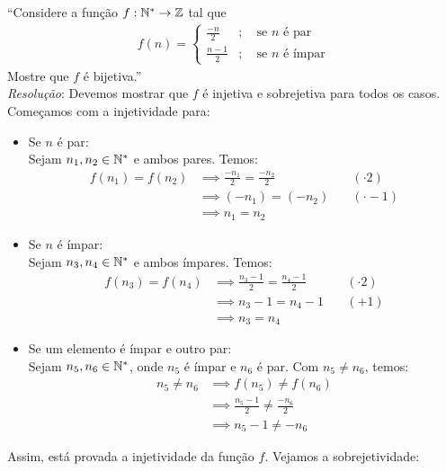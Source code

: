 \enquote{Considere a função $f: \mathbb N^* \rightarrow \mathbb Z$ tal que
\begin{align*}
f(n) = \left\{
        \begin{aligned}
            \frac{-n}{2} &; \quad \text{se $n$ é par} \\
            \frac{n - 1}{2} &; \quad \text{se $n$ é ímpar}
        \end{aligned}
        \right.
\end{align*}
Mostre que $f$ é bijetiva.} \\
\emph{Resolução}: Devemos mostrar que $f$ é injetiva e sobrejetiva para todos os casos. Começamos com a injetividade para:
\begin{itemize}
    \item Se $n$ é par: \\
    Sejam $n_1, n_2 \in \mathbb N^*$ e ambos pares. Temos:
    \begin{align*}
        f(n_1) = f(n_2) &\implies \frac{-n_1}{2} = \frac{-n_2}{2} \quad &(\cdot 2) \\ &\implies
        (-n_1) = (-n_2) \quad &(\cdot-1) \\ &\implies
        n_1 = n_2
    \end{align*}
    \item Se $n$ é ímpar: \\
    Sejam $n_3, n_4 \in \mathbb N^*$ e ambos ímpares. Temos:
    \begin{align*}
        f(n_3) = f(n_4) &\implies \frac{n_3 - 1}{2} = \frac{n_4 - 1}{2} \quad &(\cdot 2) \\ &\implies
        n_3 - 1 = n_4 - 1 \quad &(+1) \\ &\implies 
        n_3 = n_4
    \end{align*}
    \item Se um elemento é ímpar e outro par: \\
    Sejam $n_5, n_6 \in \mathbb N^*$, onde $n_5$ é ímpar e $n_6$ é par. Com $n_5 \ne n_6$, temos: 
    \begin{align*}
        n_5 \ne n_6 &\implies f(n_5) \ne f(n_6) \\ &\implies
        \frac{n_5 - 1}{2} \ne \frac{-n_6}{2} \\ &\implies
        n_5 - 1 \ne -n_6
    \end{align*}
\end{itemize}
Assim, está provada a injetividade da função $f$. Vejamos a sobrejetividade:
